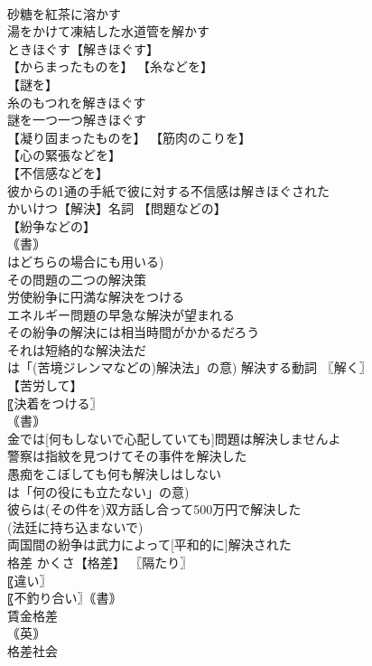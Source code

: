 \documentclass[8pt]{extreport}
\begin{document}
\begin{CJK}{UTF8}{min}
\\	砂糖を紅茶に溶かす 
\\	湯をかけて凍結した水道管を解かす 
\\	ときほぐす【解きほぐす】 
\\	【からまったものを】 【糸などを】
\\	【謎を】
\\	糸のもつれを解きほぐす 
\\	謎を一つ一つ解きほぐす 
\\	【凝り固まったものを】 【筋肉のこりを】
\\	【心の緊張などを】
\\	【不信感などを】
\\	彼からの1通の手紙で彼に対する不信感は解きほぐされた 
\\	かいけつ【解決】名詞 【問題などの】
\\	【紛争などの】
\\	｟書｠
\\	はどちらの場合にも用いる) 
\\	その問題の二つの解決策 
\\	労使紛争に円満な解決をつける 
\\	エネルギー問題の早急な解決が望まれる 
\\	その紛争の解決には相当時間がかかるだろう 
\\	それは短絡的な解決法だ 
\\	は「(苦境ジレンマなどの)解決法」の意) 解決する動詞 〖解く〗
\\	【苦労して】
\\	〖決着をつける〗
\\	｟書｠
\\	金では[何もしないで心配していても]問題は解決しませんよ 
\\	警察は指紋を見つけてその事件を解決した 
\\	愚痴をこぼしても何も解決しはしない 
\\	は「何の役にも立たない」の意) 
\\	彼らは(その件を)双方話し合って500万円で解決した 
\\	(法廷に持ち込まないで) 
\\	両国間の紛争は武力によって[平和的に]解決された 
\\	格差		かくさ【格差】 〖隔たり〗
\\	〖違い〗
\\	〖不釣り合い〗｟書｠
\\	賃金格差 
\\	｟英｠
\\	格差社会 

\end{CJK}
\end{document}
